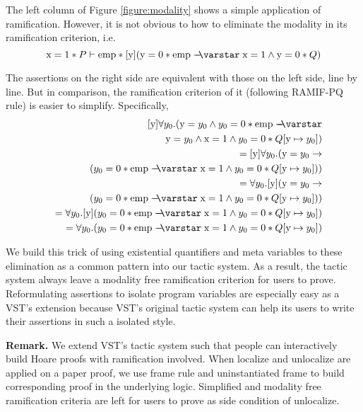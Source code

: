 \lstset{numbers=left}

The left column of Figure \ref{figure:modality} shows a simple application of ramification. However, it is not obvious to how to eliminate the modality in its ramification criterion, i.e.
$$\mathrm{x} = 1 * P \vdash \mathrm{emp} * [\mathrm{y}](\mathrm{y} = 0 * \mathrm{emp} \wand \mathrm{x} = 1 \wedge \mathrm{y} = 0 * Q)$$

The assertions on the right side are equivalent with those on the left side, line by line. But in comparison, the ramification criterion of it (following RAMIF-PQ rule) is easier to simplify. Specifically,
\begin{eqnarray*}
&&~~~~[\mathrm{y}]\forall y_0. (\mathrm{y} = y_0 \wedge y_0 = 0 * \mathrm{emp} \wand \\
&& ~~~~~~~~~   \mathrm{y} = y_0 \wedge \mathrm{x} = 1  \wedge y_0 = 0 * Q[\mathrm{y} \mapsto y_0]) \\
&&= [\mathrm{y}]\forall y_0. (\mathrm{y} = y_0 \to \\
&& ~~~~~~~~~ (y_0 = 0 * \mathrm{emp} \wand \mathrm{x} = 1  \wedge y_0 = 0 * Q[\mathrm{y} \mapsto y_0])) \\
&&= \forall y_0. [\mathrm{y}](\mathrm{y} = y_0 \to \\
&& ~~~~~~~~~ (y_0 = 0 * \mathrm{emp} \wand \mathrm{x} = 1  \wedge y_0 = 0 * Q[\mathrm{y} \mapsto y_0])) \\
&&= \forall y_0. [\mathrm{y}](y_0 = 0 * \mathrm{emp} \wand \mathrm{x} = 1  \wedge y_0 = 0 * Q[\mathrm{y} \mapsto y_0]) \\
&&= \forall y_0. (y_0 = 0 * \mathrm{emp} \wand \mathrm{x} = 1  \wedge y_0 = 0 * Q[\mathrm{y} \mapsto y_0])
\end{eqnarray*}

We build this trick of using existential quantifiers and meta variables to these elimination as a common pattern into our tactic system. As a result, the tactic system always leave a modality free ramification criterion for users to prove. Reformulating assertions to isolate program variables are especially easy as a VST's extension because VST's original tactic system can help its users to write their assertions in such a isolated style.

\textbf{Remark.} We extend VST's tactic system such that people can interactively build Hoare proofs with ramification involved. When localize and unlocalize are applied on a paper proof, we use frame rule and uninstantiated frame to build corresponding proof in the underlying logic. Simplified and modality free ramification criteria are left for users to prove as side condition of unlocalize.

